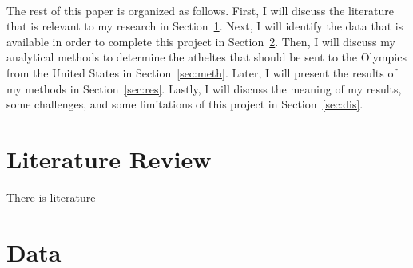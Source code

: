 \documentclass[12pt]{article}
\begin{document}
\\

The rest of this paper is organized as follows. First, I will discuss the literature that is relevant to 
my research in Section~\ref{sec:lit}. Next, I will identify the data that is available in order to complete 
this project in Section~\ref{sec:data}. Then, I will discuss my 
analytical methods to determine the atheltes that should be sent to the Olympics from the United States 
in Section~\ref{sec:meth}. Later, I will present the results of my 
methods in Section~\ref{sec:res}. Lastly, I will discuss the meaning of my results, some challenges, 
and some limitations of this project in Section~\ref{sec:dis}.

\section{Literature Review}
\label{sec:lit}

There is literature

\section{Data}
\label{sec:data}
\end{document}
